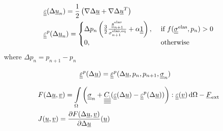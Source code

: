 \documentclass[12pt]{article}
\begin{document}
\begin{appendices}
    \begin{align}
        & \uueps(\Delta\uu_n) = \frac{1}{2} \left( \nabla\Delta\uu + \nabla\Delta\uu^T \right) \\
        & \uueps^p(\Delta\uu_n) = 
            \begin{cases}
                \Delta p_n \left( \frac{3}{2}\frac{\uusnelas}{\sigmaeqnelas} + \alpha \uuUnit \right), & \text{ if } f(\uusigma^\text{elas}, p_n) > 0  \\
                0, & \text{ otherwise}
            \end{cases}
    \end{align}
    where $\Delta p_n = p_{n+1} - p_n$ 

    \begin{align}
        & \uueps^p(\Delta\uu) = \uueps^p(\Delta\uu, p_n, p_{n+1}, \uusigma_n)
    \end{align}

    \begin{align}
        & F(\Delta\uu, \uv) = \int\limits_\Omega \left( \uusigma_n + \uuuuC : (\uueps(\Delta\uu) - \uueps^p(\Delta\uu)) \right) : \uueps(\uv) \, \md\Omega - \uF_\text{ext} \\
        & J(\uu, \uv) = \frac{\partial F(\Delta\uu, \uv)}{\partial\Delta\uu}(\uu)
    \end{align}

\end{appendices}
\end{document}
